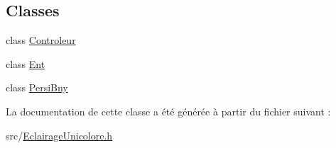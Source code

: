 \subsection*{Classes}
\begin{DoxyCompactItemize}
\item 
class \hyperlink{classEclairageUnicolore_1_1Controleur}{Controleur}
\item 
class \hyperlink{classEclairageUnicolore_1_1Ent}{Ent}
\item 
class \hyperlink{classEclairageUnicolore_1_1PersiBny}{Persi\+Bny}
\end{DoxyCompactItemize}


La documentation de cette classe a été générée à partir du fichier suivant \+:\begin{DoxyCompactItemize}
\item 
src/\hyperlink{EclairageUnicolore_8h}{Eclairage\+Unicolore.\+h}\end{DoxyCompactItemize}
